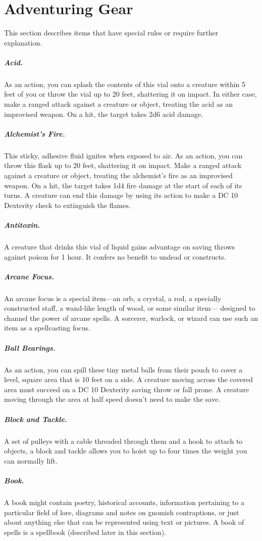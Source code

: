 \section{Adventuring Gear}

This section describes items that have special rules or require further explanation.

\subparagraph*{Acid.} As an action, you can splash the contents of this vial onto a creature within 5 feet of you or throw the vial up to 20 feet, shattering it on impact. In either case, make a ranged attack against a creature or object, treating the acid as an improvised weapon. On a hit, the target takes 2d6 acid damage.

\subparagraph*{Alchemist's Fire.} This sticky, adhesive fluid ignites when exposed to air. As an action, you can throw this flask up to 20 feet, shattering it on impact. Make a ranged attack against a creature or object, treating the alchemist's fire as an improvised weapon. On a hit, the target takes 1d4 fire damage at the start of each of its turns. A creature can end this damage by using its action to make a DC 10 Dexterity check to extinguish the flames.

\subparagraph*{Antitoxin.} A creature that drinks this vial of liquid gains advantage on saving throws against poison for 1 hour. It confers no benefit to undead or constructs.

\subparagraph*{Arcane Focus.} An arcane focus is a special item—an orb, a crystal, a rod, a specially constructed staff, a wand-like length of wood, or some similar item— designed to channel the power of arcane spells. A sorcerer, warlock, or wizard can use such an item as a spellcasting focus.

\subparagraph*{Ball Bearings.} As an action, you can spill these tiny metal balls from their pouch to cover a level, square area that is 10 feet on a side. A creature moving across the covered area must succeed on a DC 10 Dexterity saving throw or fall prone. A creature moving through the area at half speed doesn't need to make the save.

\subparagraph*{Block and Tackle.} A set of pulleys with a cable threaded through them and a hook to attach to objects, a block and tackle allows you to hoist up to four times the weight you can normally lift.

\subparagraph*{Book.} A book might contain poetry, historical accounts, information pertaining to a particular field of lore, diagrams and notes on gnomish contraptions, or just about anything else that can be represented using text or pictures. A book of spells is a spellbook (described later in this section).

